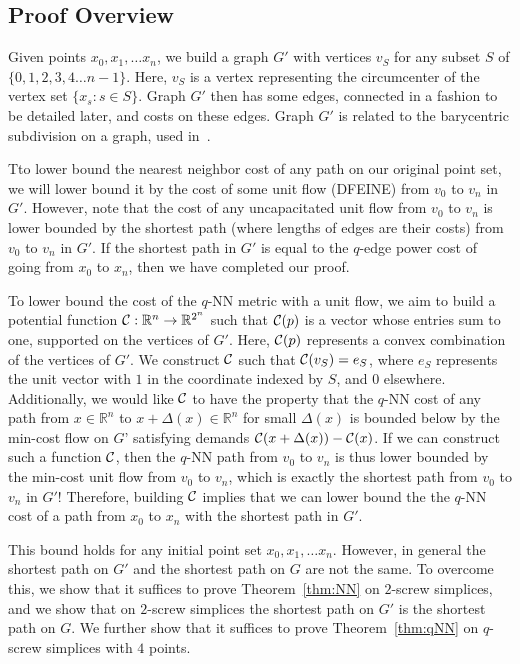 \subsection{Proof Overview}

Given points $x_0, x_1, \ldots x_n$, we build a graph $G'$ with
vertices $v_S$ for any subset $S$ of
$\{0,1,2,3,4 \ldots n-1 \}$. Here, $v_S$ is a vertex representing the
circumcenter of the vertex set $\{x_s: s \in S\}$. Graph $G'$ then has some
edges, connected in a fashion to be detailed later, and costs on these edges.
Graph $G'$ is related to the barycentric subdivision on a graph, used
in~\cite{}.

Tto lower bound the nearest neighbor cost of any path on our original point
set, we will lower bound it by the cost of some unit flow (DFEINE) from
$v_0$ to $v_n$ in $G'$. However, note that the cost of any uncapacitated
unit flow from $v_0$ to $v_n$ is lower bounded by the shortest path (where
lengths of edges are their costs) from $v_0$ to $v_n$ in $G'$.
If the shortest path in $G'$ is equal to the $q$-edge power cost of going
from $x_0$ to $x_n$, then we have completed our proof.

To lower bound the cost of the $q$-NN metric with a unit flow, we aim to build
a potential function $\mathcal{C}:\mathbb{R}^n \rightarrow \mathbb{R}^{2^n}$ such
that $\mathcal{C}(p)$ is a vector whose entries sum to one, supported on the
vertices of $G'$. Here, $\mathcal{C}(p)$
represents a convex combination of the vertices of $G'$. We construct $\mathcal{C}$
such that $\mathcal{C}(v_S) = e_S$, where $e_S$ represents the unit vector with $1$
in the coordinate indexed by $S$, and $0$ elsewhere. Additionally, we would
like $\mathcal{C}$ to have
the property that the $q$-NN cost of any path from $x \in \mathbb{R}^n$ to
$x+\Delta(x) \in \mathbb{R}^n$ for small $\Delta(x)$ is
bounded below by the min-cost flow on $G’$ satisfying demands
$\mathcal{C}(x+\Delta(x)) - \mathcal{C}(x)$. If we can construct such a function $\mathcal{C}$,
then the $q$-NN path from $v_0$ to $v_n$ is thus lower bounded by the min-cost
unit flow from $v_0$ to $v_n$, which is exactly the shortest path from
$v_0$ to $v_n$ in $G'$!
 Therefore, building $\mathcal{C}$ implies that we can lower bound the
the $q$-NN cost of a path from $x_0$ to $x_n$ with the shortest path in $G'$.

This bound holds for any initial point set $x_0, x_1, \ldots x_n$. However,
in general the shortest path on $G'$ and the shortest path on $G$ are not
the same. To overcome this, we show that it suffices to prove
Theorem~\ref{thm:NN} on $2$-screw simplices, and we show that on $2$-screw
simplices the shortest path on $G'$ is the shortest path on $G$. We further
show that it suffices to prove Theorem~\ref{thm:qNN} on $q$-screw simplices
with $4$ points.

